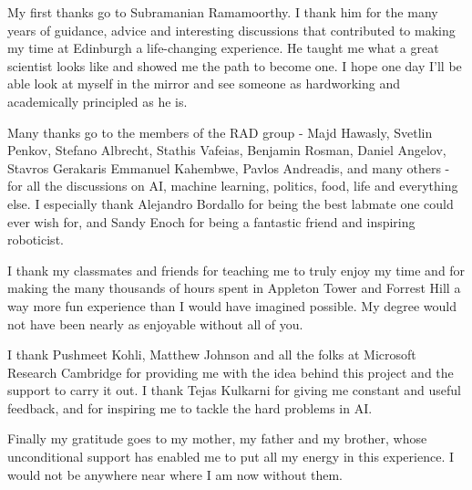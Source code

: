 \begin{acknowledgements}

  My first thanks go to Subramanian Ramamoorthy. I thank him for the many years
  of guidance, advice and interesting discussions that contributed to making my
  time at Edinburgh a life-changing experience. He taught me what a great
  scientist looks like and showed me the path to become one. I hope one day I'll
  be able look at myself in the mirror and see someone as hardworking and
  academically principled as he is.

  Many thanks go to the members of the RAD group - Majd Hawasly, Svetlin Penkov,
  Stefano Albrecht, Stathis Vafeias, Benjamin Rosman, Daniel Angelov, Stavros
  Gerakaris Emmanuel Kahembwe, Pavlos Andreadis, and many others - for all the
  discussions on AI, machine learning, politics, food, life and everything else.
  I especially thank Alejandro Bordallo for being the best labmate one could
  ever wish for, and Sandy Enoch for being a fantastic friend and inspiring
  roboticist.

  I thank my classmates and friends for teaching me to truly enjoy my time and
  for making the many thousands of hours spent in Appleton Tower and Forrest
  Hill a way more fun experience than I would have imagined possible. My degree
  would not have been nearly as enjoyable without all of you.

  I thank Pushmeet Kohli, Matthew Johnson and all the folks at Microsoft
  Research Cambridge for providing me with the idea behind this project and the
  support to carry it out. I thank Tejas Kulkarni for giving me constant and
  useful feedback, and for inspiring me to tackle the hard problems in AI.

  Finally my gratitude goes to my mother, my father and my brother, whose
  unconditional support has enabled me to put all my energy in this experience.
  I would not be anywhere near where I am now without them.

\end{acknowledgements}